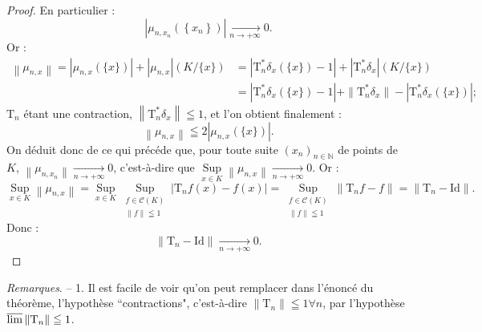 \documentclass{article}
\theoremstyle{plain}
\begin{document}
\begin{proof}
	En particulier :
	\begin{equation*}
		\left|\mu_{n, x_{n}}\left(\left\{x_{n}\right\}\right)\right| \underset{n \rightarrow+\infty}{\longrightarrow} 0 .
	\end{equation*}
	Or :
	\begin{equation*}
		\begin{aligned}
			\left\|\mu_{n, x}\right\|=\left|\mu_{n, x}(\{x\})\right|+\left|\mu_{n, x}\right|(K /\{x\}) &=\left|\mathrm{T}_{n}^{*} \delta_{x}(\{x\})-1\right|+\left|\mathrm{T}_{n}^{*} \delta_{x}\right|(K /\{x\}) \\
			&=\left|\mathrm{T}_{n}^{*} \delta_{x}(\{x\})-1\right|+\| \mathrm{T}_{n}^{*} \delta_{x}\|-\left|\mathrm{T}_{n}^{*} \delta_{x}(\{x\})\right|;
		\end{aligned}
	\end{equation*}
	$\mathrm{T}_{n}$ étant une contraction, $\left\|\mathrm{T}_{n}^{*} \delta_{x}\right\| \leqq 1$, et l'on obtient finalement :
	\begin{equation*}
		\left\|\mu_{n, x}\right\| \leqq 2\left|\mu_{n, x}(\{x\})\right| .
	\end{equation*}
	On déduit donc de ce qui précéde que, pour toute suite $\left(x_{n}\right)_{n \in \mathbb{N}}$ de points de $K$, $\left\|\mu_{n, x_{n}}\right\| \underset{n \rightarrow+\infty}{\longrightarrow} 0$, c'est-à-dire que $\underset{x \in K}{\operatorname{Sup}} \left\|\mu_{n, x}\right\| \underset{n \rightarrow+\infty}{\longrightarrow} 0$.
	Or :
	\begin{equation*}
		\underset{x \in K}{\operatorname{Sup}} \left\|\mu_{n, x}\right\|
		= \underset{x \in K}{\operatorname{Sup}} \underset{\substack{f \in \mathscr{C}(K) \\ \|f\| \leqq 1}}{\operatorname{Sup}} \left| \mathrm{T}_nf(x) - f(x) \right|
		= \underset{\substack{f \in \mathscr{C}(K) \\ \|f\| \leqq 1}}{\operatorname{Sup}} \left\| \mathrm{T}_nf - f \right\|
		= \left\| \mathrm{T}_n - \mathrm{Id} \right\|.
	\end{equation*}
	Donc :
	\begin{equation*}
		\left\|\mathrm{T}_{n}-\mathrm{Id}\right\| \underset{n \rightarrow+\infty}{\longrightarrow} 0.
	\end{equation*}
\end{proof}

\emph{Remarques}. -- 1. Il est facile de voir qu'on peut remplacer dans l'énoncé du théorème, l'hypothèse ``contractions", c'est-à-dire $\left\|\mathrm{T}_{n}\right\| \leqq 1 \forall n$, par l'hypothèse $\varlimsup \left\|\mathrm{T}_{n}\right\| \leqq 1$.
\end{document}

